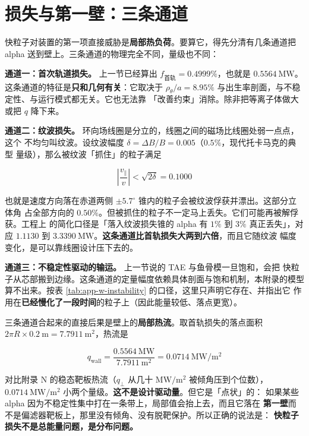 \section{损失与第一壁：三条通道}
\label{sec:app-w-loss}

快粒子对装置的第一项直接威胁是\textbf{局部热负荷}。要算它，得先分清有几条通道把 alpha
送到壁上。三条通道的物理完全不同，量级也不同：

\textbf{通道一：首次轨道损失。} 上一节已经算出 $f_{\text{首轨}}=0.4999\%$，也就是
$0.5564\ \mathrm{MW}$。这条通道的特征是\textbf{只和几何有关}：它取决于
$\rho_\theta/a=8.95\%$ 与出生率剖面，与不稳定性、与运行模式都无关。它也无法靠
「改善约束」消除。除非把等离子体做大或把 $q$ 降下来。

\textbf{通道二：纹波损失。} 环向场线圈是分立的，线圈之间的磁场比线圈处弱一点点，这个
不均匀叫纹波。设纹波幅度 $\delta=\Delta B/B=0.005$（$0.5\%$，现代托卡马克的典型
量级），那么被纹波「抓住」的粒子满足

\begin{equation}
\left|\frac{v_\parallel}{v}\right| < \sqrt{2\delta} = 0.1000
\label{eq:app-w-ripple}
\end{equation}

也就是速度方向落在赤道两侧 $\pm5.7^\circ$ 锥内的粒子会被纹波俘获并漂出。这部分立体角
占全部方向的 $0.50\%$。但被抓住的粒子不一定马上丢失。它们可能再被解俘获。工程上
的简化口径是「落入纹波损失锥的 alpha 有 $1\%$ 到 $3\%$ 真正丢失」，对应
$1.1130$ 到 $3.3390\ \mathrm{MW}$。\textbf{这条通道比首轨损失大两到六倍}，而且它随纹波
幅度变化，是可以靠线圈设计压下去的。

\textbf{通道三：不稳定性驱动的输运。} 上一节说的 TAE 与鱼骨模一旦饱和，会把
快粒子从芯部搬到边缘。这条通道的定量幅度依赖具体剖面与饱和机制，本附录的模型
算不出来。按表 \ref{tab:app-w-instability} 的口径，这里只声明它存在、并指出它
作用在\textbf{已经慢化了一段时间}的粒子上（因此能量较低、落点更宽）。

三条通道合起来的直接后果是壁上的\textbf{局部热流}。取首轨损失的落点面积
$2\pi R\times0.2\ \mathrm{m}=7.7911\ \mathrm{m^2}$，热流是

\begin{equation}
q_{\text{wall}} = \frac{0.5564\ \mathrm{MW}}{7.7911\ \mathrm{m^2}}
= 0.0714\ \mathrm{MW/m^2}
\label{eq:app-w-qwall}
\end{equation}

对比附录 N 的稳态靶板热流（$q_\perp$ 从几十 $\mathrm{MW/m^2}$ 被倾角压到个位数），
$0.0714\ \mathrm{MW/m^2}$ 小两个量级。\textbf{这不是设计驱动量}。但它是「点状」的：
如果某些 alpha 因为不稳定性集中打在一条带上，局部值会抬上去，而且它落在
\textbf{第一壁}而不是偏滤器靶板上，那里没有倾角、没有脱靶保护。所以正确的说法是：
\textbf{快粒子损失不是总能量问题，是分布问题。}

